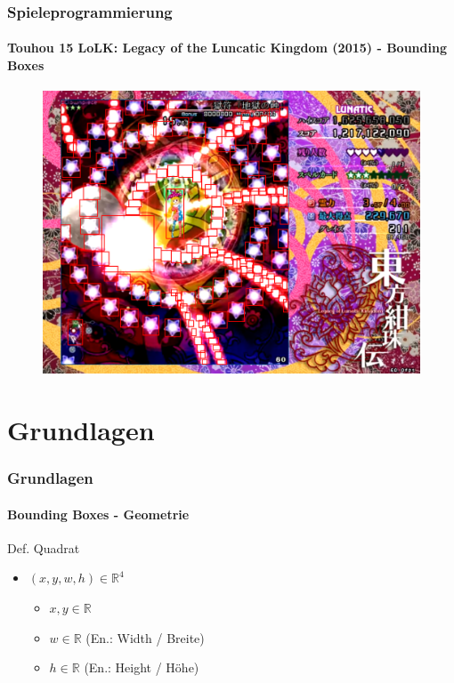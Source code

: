 \documentclass{beamer}
\begin{document}
\begin{frame}
  \frametitle{Spieleprogrammierung}
  \framesubtitle{Touhou 15 LoLK: Legacy of the Luncatic Kingdom (2015) - Bounding Boxes}
  \begin{figure}
    \includegraphics[scale=0.25]{rsrc/touhoubbox}
  \end{figure}
\end{frame}

\section{Grundlagen}

\begin{frame}
  \frametitle{Grundlagen}
  \framesubtitle{Bounding Boxes - Geometrie}
  \begin{figure}
  \end{figure}
  
  \begin{block}{Def. Quadrat}
    \begin{itemize}
      \item $(x,y,w,h) \in \mathbb{R}^4$
      \begin{itemize}
        \item $x, y \in \mathbb{R}$
        \item $w \in \mathbb{R}$ (En.: Width / Breite)
        \item $h \in \mathbb{R}$ (En.: Height / Höhe)
      \end{itemize}
    \end{itemize}
  \end{block}
\end{frame}
\end{document}
